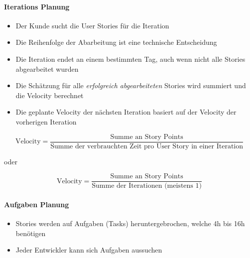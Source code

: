 \documentclass[
    ngerman,
    color=3b,
    summary,
    boxarc,
    main,
]{rubos-tuda-template}
\begin{document}
\paragraph{Iterations Planung}
\begin{itemize}
    \item Der Kunde sucht die User Stories für die Iteration
    \item Die Reihenfolge der Abarbeitung ist eine technische Entscheidung
    \item Die Iteration endet an einem bestimmten Tag, auch wenn nicht alle Stories abgearbeitet wurden
    \item Die Schätzung für alle \textit{erfolgreich abgearbeiteten} Stories wird summiert und die Velocity berechnet
    \item Die geplante Velocity der nächsten Iteration basiert auf der Velocity der vorherigen Iteration
\end{itemize}

\begin{equation*}
    \text{Velocity} = \frac{\text{Summe an Story Points}}{\text{Summe der verbrauchten Zeit pro User Story in einer Iteration}}
\end{equation*}

oder

\begin{equation*}
    \text{Velocity} = \frac{\text{Summe an Story Points}}{\text{Summe der Iterationen (meistens 1)}}
\end{equation*}

\paragraph{Aufgaben Planung}
\begin{itemize}
    \item Stories werden auf Aufgaben (Tasks) heruntergebrochen, welche 4h bis 16h benötigen
    \item Jeder Entwickler kann sich Aufgaben aussuchen
\end{itemize}


\clearpage
\end{document}
